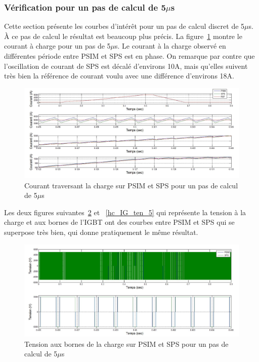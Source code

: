 \documentclass[11pt,letterpaper,final]{report}
\begin{document}
\subsubsection{Vérification pour un pas de calcul de 5$\mu$s}
Cette section présente les courbes d'intérêt pour un pas de calcul discret de 5$\mu$s. À ce pas de calcul le résultat est beaucoup plus précis. La figure~\ref{hc_cou_ch_5}
montre le courant à charge pour un pas de 5$\mu$s.  Le courant à la charge observé en différentes période entre PSIM et SPS est en phase. On remarque par contre que l'oscillation de courant de SPS est décalé d'environs 10A, mais qu'elles suivent très bien la référence de courant voulu avec une différence d'environs 18A.
\begin{figure}[htb]
\centering
\includegraphics[scale=0.5]{Fig/Hacheur4Quadrants/HacheurCourantCharge5u.jpg}
\caption{Courant traversant la charge sur PSIM et SPS pour un pas de calcul de 5$\mu$s}
\label{hc_cou_ch_5}
\end{figure}
Les deux figures suivantes~\ref{hc_ten_ch_5} et ~\ref{hc_IG_ten_5} qui représente la tension à la charge et aux bornes de l'IGBT ont des courbes entre PSIM et SPS qui se superpose très bien, qui donne pratiquement le même résultat.


\begin{figure}[htb]
\centering
\includegraphics[scale=0.5]{Fig/Hacheur4Quadrants/HacheurTensionCharge5u.jpg}
\caption{Tension aux bornes de la charge sur PSIM et SPS pour un pas de calcul de 5$\mu$s}
\label{hc_ten_ch_5}
\end{figure}
\end{document}
